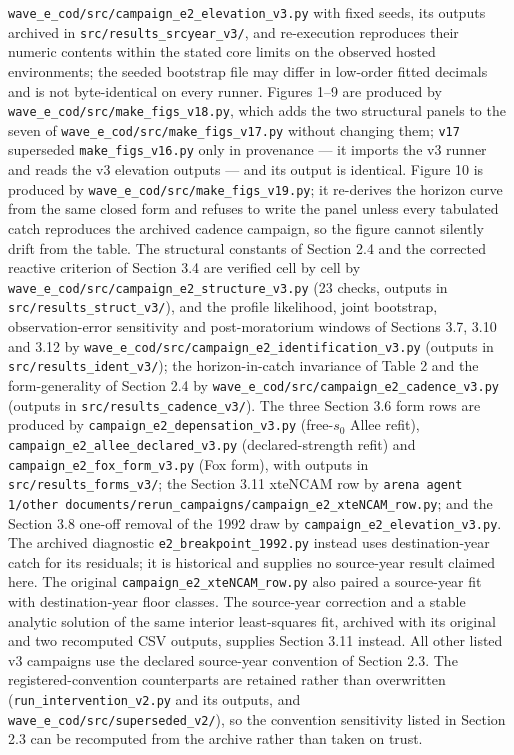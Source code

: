 \documentclass[11pt]{article}
\begin{document}
\texttt{wave\_e\_cod/src/campaign\_e2\_elevation\_v3.py} with fixed
seeds, its outputs archived in \texttt{src/results\_srcyear\_v3/}, and
re-execution reproduces their numeric contents within the stated core limits on the observed hosted environments; the seeded bootstrap file may differ in low-order fitted decimals and is not byte-identical on every runner. Figures 1--9 are produced by
\texttt{wave\_e\_cod/src/make\_figs\_v18.py}, which adds the two
structural panels to the seven of
\texttt{wave\_e\_cod/src/make\_figs\_v17.py} without changing them;
\texttt{v17} superseded \texttt{make\_figs\_v16.py} only in
provenance --- it imports the v3 runner and reads the v3 elevation
outputs --- and its output is
identical. Figure 10 is produced by
\texttt{wave\_e\_cod/src/make\_figs\_v19.py}; it re-derives the
horizon curve from the same closed form and refuses to write the panel
unless every tabulated catch reproduces the archived cadence campaign,
so the figure cannot silently drift from the table. The structural
constants of Section 2.4 and the corrected reactive
criterion of Section 3.4 are verified cell by cell by
\texttt{wave\_e\_cod/src/\allowbreak{}campaign\_e2\_structure\_v3.py} (23 checks,
outputs in \texttt{src/results\_struct\_v3/}), and the profile
likelihood, joint bootstrap, observation-error sensitivity and
post-moratorium windows of Sections 3.7, 3.10 and 3.12 by
\texttt{wave\_e\_cod/src/\allowbreak{}campaign\_e2\_identification\_v3.py}
(outputs in \texttt{src/results\_ident\_v3/}); the horizon-in-catch invariance of Table 2 and the form-generality of Section 2.4 by
\texttt{wave\_e\_cod/src/\allowbreak{}campaign\_e2\_cadence\_v3.py} (outputs in \texttt{src/results\_cadence\_v3/}). The three Section 3.6
form rows are produced by
\texttt{campaign\_e2\_depensation\_v3.py} (free-\(s_0\) Allee refit),
\texttt{campaign\_e2\_allee\_declared\_v3.py} (declared-strength refit)
and \texttt{campaign\_e2\_fox\_form\_v3.py} (Fox form), with outputs in
\texttt{src/results\_forms\_v3/}; the Section 3.11 xteNCAM row by
\texttt{arena agent 1/other documents/rerun\_campaigns/\allowbreak{}campaign\_e2\_xteNCAM\_row.py};
and the Section 3.8 one-off removal of the 1992 draw by
\texttt{campaign\_e2\_elevation\_v3.py}. The archived diagnostic
\texttt{e2\_breakpoint\_1992.py} instead uses destination-year catch
for its residuals; it is historical and supplies no source-year result
claimed here. The original \texttt{campaign\_e2\_xteNCAM\_row.py}
also paired a source-year fit with destination-year floor classes. The
source-year correction and a stable analytic solution of the same
interior least-squares fit, archived with its original and two
recomputed CSV outputs, supplies Section 3.11 instead. All other listed
v3 campaigns use the declared source-year convention of Section 2.3. The
registered-convention counterparts are retained rather than overwritten
(\texttt{run\_intervention\_v2.py} and its outputs, and
\texttt{wave\_e\_cod/src/superseded\_v2/}), so the convention sensitivity
listed in Section 2.3 can be recomputed from the archive rather than
taken on trust.
\end{document}
